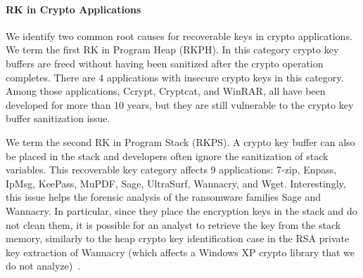 

\paragraph{RK in Crypto Applications} We identify two common root causes for recoverable keys in crypto applications. We term the first {RK in Program Heap (RKPH)}. In this category crypto key buffers are  freed without having been sanitized after the crypto operation %
completes.  There are 4 applications with insecure crypto keys in this category. Among those applications, \textsf{\small Ccrypt}, \textsf{\small Cryptcat}, and \textsf{\small WinRAR},  all have  been developed for more than 10 years, but they are still vulnerable to the crypto key buffer sanitization issue.

We term the second {RK in Program Stack (RKPS)}. A crypto key buffer can also be placed in the stack and developers often ignore the sanitization of stack variables. 
This recoverable key category affects 9 applications:  \textsf{\small 7-zip}, \textsf{\small Enpass}, \textsf{\small IpMsg}, \textsf{\small KeePass}, \textsf{\small MuPDF}, \textsf{\small Sage}, \textsf{\small UltraSurf}, \textsf{\small Wannacry}, and \textsf{\small Wget}. Interestingly, this issue helps the forensic analysis of the ransomware families \textsf{\small Sage} and \textsf{\small Wannacry}. 
In particular, since they place the encryption keys in the stack and do not clean them, it is possible for an analyst to retrieve the key from the stack memory, similarly to the heap crypto key identification case in the \textsf{\small RSA} private key extraction of \textsf{\small Wannacry} (which affects a Windows XP crypto library that we do not analyze)~\cite{wannakey}.%



